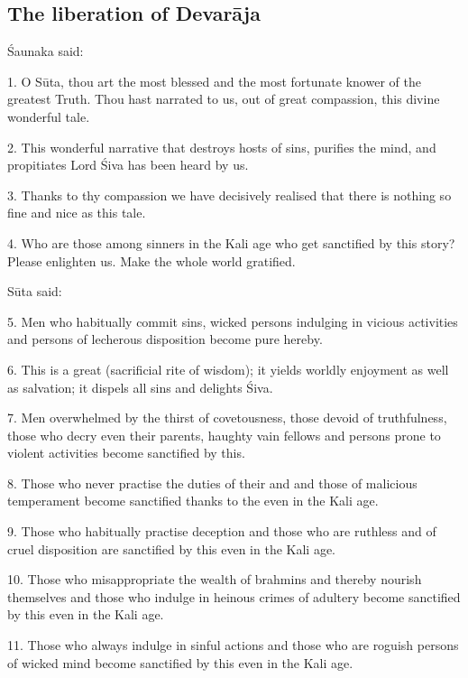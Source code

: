{}
\subsection*{The liberation of Devarāja}

Śaunaka said:

1. O Sūta, thou art the most blessed and the most fortunate knower of the
greatest Truth. Thou hast narrated to us, out of great compassion, this divine
wonderful tale.

2. This wonderful narrative that destroys hosts of sins, purifies the mind,
and propitiates Lord Śiva has been heard by us.

3. Thanks to thy compassion we have decisively realised that there is nothing so
fine and nice as this tale.

4. Who are those among sinners in the Kali age who get sanctified by this story?
Please enlighten us. Make the whole world gratified.

Sūta said:

5. Men who habitually commit sins, wicked persons indulging in vicious
activities and persons of lecherous disposition become pure hereby.

6. This is a great  (sacrificial rite of wisdom); it yields
worldly enjoyment as well as salvation; it dispels all sins and delights Śiva.

7. Men overwhelmed by the thirst of covetousness, those devoid of truthfulness,
those who decry even their parents, haughty vain fellows and persons prone to
violent activities become sanctified by this.

8. Those who never practise the duties of their  and  and
those of malicious temperament become sanctified thanks to the 
even in the Kali age.

9. Those who habitually practise deception and those who are ruthless and of
cruel disposition are sanctified by this  even in the Kali age.

10. Those who misappropriate the wealth of brahmins and thereby nourish
themselves and those who indulge in heinous crimes of adultery become sanctified
by this  even in the Kali age.

11. Those who always indulge in sinful actions and those who are roguish persons
of wicked mind become sanctified by this  even in the Kali age.

